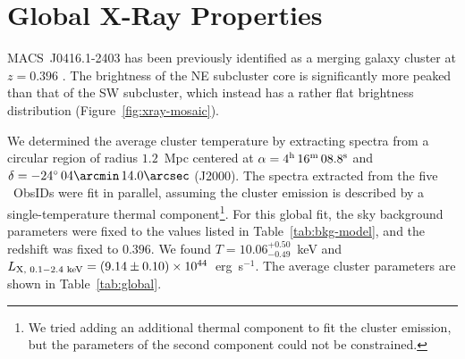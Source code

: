 \section{Global X-Ray Properties}
\label{sec:global}

MACS~J0416.1-2403 has been previously identified as a merging galaxy cluster at $z=0.396$ \citep{Mann2012}. The brightness of the NE subcluster core is significantly more peaked than that of the SW subcluster, which instead has a rather flat brightness distribution (Figure~\ref{fig:xray-mosaic}). 

We determined the average cluster temperature by extracting spectra from a circular region of radius $1.2$~Mpc \citep[approximately $R_{\rm 500}$,][]{Sayers2013} centered at $\alpha=4^{\rm h}\, 16^{\rm m}\, 08.8^{\rm s}$ and $\delta=-24^{\circ}\, 04\arcmin \, 14.0\arcsec$ (J2000). The spectra extracted from the five \chandra\ ObsIDs were fit in parallel, assuming the cluster emission is described by a single-temperature thermal component\footnote{We tried adding an additional thermal component to fit the cluster emission, but the parameters of the second component could not be constrained.}. For this global fit, the sky background parameters were fixed to the values listed in Table~\ref{tab:bkg-model}, and the redshift was fixed to $0.396$. We found $T=10.06_{-0.49}^{+0.50}$~keV and $L_{\rm X, \,\, 0.1-2.4\,\,keV} = (9.14\pm 0.10)\times 10^{44}$~erg~s$^{-1}$. The average cluster parameters are shown in Table~\ref{tab:global}.


